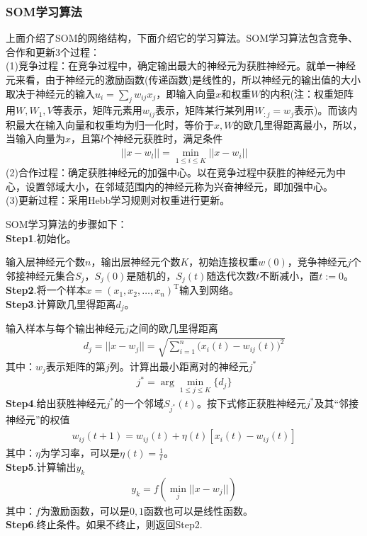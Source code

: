         \subsubsection{SOM学习算法}
            \par
            上面介绍了SOM的网络结构，下面介绍它的学习算法。SOM学习算法包含竞争、合作和更新3个过程：\\
            (1)竞争过程：在竞争过程中，确定输出最大的神经元为获胜神经元。就单一神经元来看，由于神经元的激励函数(传递函数)是线性的，所以神经元的输出值的大小取决于神经元的输入$u_i = \sum_j w_{ij}x_j$，即输入向量$x$和权重$W$的内积(注：权重矩阵用$W,W_1,V$等表示，矩阵元素用$w_{ij}$表示，矩阵某行某列用$W_{:j} = w_j$表示)。而该内积最大在输入向量和权重均为归一化时，等价于$x,W$的欧几里得距离最小，所以，当输入向量为$x$，且第$l$个神经元获胜时，满足条件
            \begin{align*}
            ||x-w_l|| = \min_{1 \leqslant i \leqslant K} ||x-w_i||
            \end{align*}
            (2)合作过程：确定获胜神经元的加强中心。以在竞争过程中获胜的神经元为中心，设置邻域大小，在邻域范围内的神经元称为兴奋神经元，即加强中心。\\
            (3)更新过程：采用Hebb学习规则对权重进行更新。
            \par
            SOM学习算法的步骤如下：\\
            \textbf{Step1}.初始化。\par
            输入层神经元个数$n$，输出层神经元个数$K$，初始连接权重$w(0)$，竞争神经元$j$个邻接神经元集合$S_j$，$S_j(0)$是随机的，$S_j(t)$随迭代次数$t$不断减小，置$t:=0$。\\
            \textbf{Step2}.将一个样本$x=(x_1,x_2,\dots,x_n)^\mathrm{T}$输入到网络。\\
            \textbf{Step3}.计算欧几里得距离$d_j$。\par
            输入样本与每个输出神经元$j$之间的欧几里得距离
            \begin{align*}
            d_j = ||x-w_j|| = \sqrt{\sum_{i=1}^n\Big(x_i(t) - w_{ij}(t)\Big)^2}
            \end{align*}
            其中：$w_j$表示矩阵的第$j$列。计算出最小距离对的神经元$j^*$
            \begin{align*}
            j^* = \arg \min_{1 \leqslant j \leqslant K} \{d_j\}
            \end{align*}
            \textbf{Step4}.给出获胜神经元$j^*$的一个邻域$S_{j^*}(t)$。按下式修正获胜神经元$j^*$及其“邻接神经元”的权值
            \begin{align*}
            w_{ij}(t+1) =w_{ij}(t) + \eta(t)[x_i(t) - w_{ij}(t)]
            \end{align*}
            其中：$\eta$为学习率，可以是$\eta(t) = \frac{1}{t}$。\\
            \textbf{Step5}.计算输出$y_k$
            \begin{align*}
            y_k = f(\min_j ||x - w_j||)
            \end{align*}
            其中：$f$为激励函数，可以是$0,1$函数也可以是线性函数。\\
            \textbf{Step6}.终止条件。如果不终止，则返回Step2.
